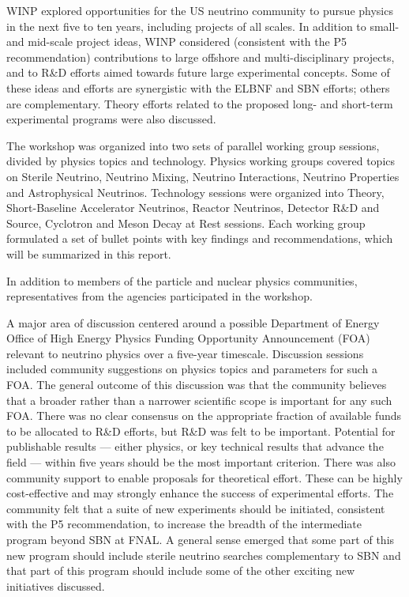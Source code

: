 WINP explored opportunities for the US neutrino community to pursue
physics in the next five to ten years, including projects of all
scales.  In addition to small- and mid-scale project ideas, WINP
considered (consistent with the P5 recommendation) contributions to
large offshore and multi-disciplinary projects, and to R\&D efforts
aimed towards future large experimental concepts.  Some of these ideas
and efforts are synergistic with the ELBNF and SBN efforts; others are
complementary.  Theory efforts related to the proposed long- and
short-term experimental programs were also discussed.

The workshop was organized into two sets of parallel working group
sessions, divided by physics topics and technology.  Physics working
groups covered topics on Sterile Neutrino, Neutrino Mixing, Neutrino
Interactions, Neutrino Properties and Astrophysical Neutrinos.
Technology sessions were organized into Theory, Short-Baseline
Accelerator Neutrinos, Reactor Neutrinos, Detector R\&D and Source,
Cyclotron and Meson Decay at Rest sessions.  Each working group
formulated a set of bullet points with key findings and
recommendations, which will be summarized in this report.


In addition to members of the particle and nuclear physics
communities, representatives from the agencies participated in the workshop.

A major area of discussion centered around a possible Department of Energy
Office of High Energy Physics Funding Opportunity
Announcement (FOA) relevant to neutrino physics over a five-year timescale.
Discussion sessions included community suggestions on physics topics and parameters for such a FOA.
The general outcome of this discussion was that the community believes that a
broader rather than a narrower scientific scope is important for any such FOA.  There was no clear
consensus on the appropriate fraction of available funds to be
allocated to R\&D efforts, but R\&D was felt to be important.  
Potential for publishable results ---
either physics, or key technical results that advance the field ---
within five years should be the most important criterion.  There was
also community support to enable proposals for theoretical effort.
These can be highly cost-effective and may strongly enhance the
success of experimental efforts.  
The community felt that a suite of new experiments should be
initiated, consistent with the P5 recommendation, to increase the
breadth of the intermediate program beyond SBN at FNAL. A general
sense emerged that some part of this new program should include
sterile neutrino searches complementary to SBN and that part of this
program should include some of the other exciting new initiatives
discussed.

